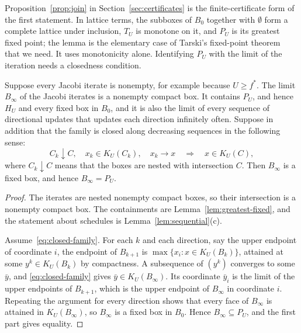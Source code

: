 Proposition~\ref{prop:join} in Section~\ref{sec:certificates} is the
finite-certificate form of the first statement. In lattice terms, the
subboxes of $B_0$ together with $\emptyset$ form a complete lattice under
inclusion, $T_U$ is monotone on it, and $P_U$ is its greatest fixed point;
the lemma is the elementary case of Tarski's
fixed-point theorem~\cite{tarski1955fixpoint} that we need. It uses
monotonicity alone. Identifying $P_U$ with the limit of the iteration needs
a closedness condition.

\begin{proposition}\label{prop:fixed-limit}
Suppose every Jacobi iterate is nonempty, for example because $U\ge f^*$.
The limit $B_\infty$ of the Jacobi iterates is a nonempty compact box. It
contains $P_U$, and hence $H_U$ and every fixed box in $B_0$, and it is
also the limit of every sequence of directional updates that updates each
direction infinitely often. Suppose
in addition that the family is closed along decreasing sequences in the
following sense:
\begin{equation}\label{eq:closed-family}
  C_k\downarrow C,\quad x_k\in K_U(C_k),\quad x_k\to x
  \quad\Longrightarrow\quad x\in K_U(C),
\end{equation}
where $C_k\downarrow C$ means that the boxes are nested with intersection
$C$. Then $B_\infty$ is a fixed box, and hence $B_\infty=P_U$.
\end{proposition}

\begin{proof}
The iterates are nested nonempty compact boxes, so their intersection is a
nonempty compact box. The containments are
Lemma~\ref{lem:greatest-fixed}, and the statement about schedules is
Lemma~\ref{lem:sequential}(c).

Assume~\eqref{eq:closed-family}. For each $k$ and each direction, say the
upper endpoint of coordinate $i$, the endpoint of $B_{k+1}$ is
$\max\{x_i:x\in K_U(B_k)\}$, attained at some $y^k\in K_U(B_k)$ by
compactness. A subsequence of $(y^k)$ converges to some $\bar y$, and
\eqref{eq:closed-family} gives $\bar y\in K_U(B_\infty)$. Its coordinate
$\bar y_i$ is the limit of the upper endpoints of $B_{k+1}$, which is the
upper endpoint of $B_\infty$ in coordinate $i$. Repeating the argument for
every direction shows that every face of $B_\infty$ is attained in
$K_U(B_\infty)$, so $B_\infty$ is a fixed box in $B_0$. Hence
$B_\infty\subseteq P_U$, and the first part gives equality.
\end{proof}

